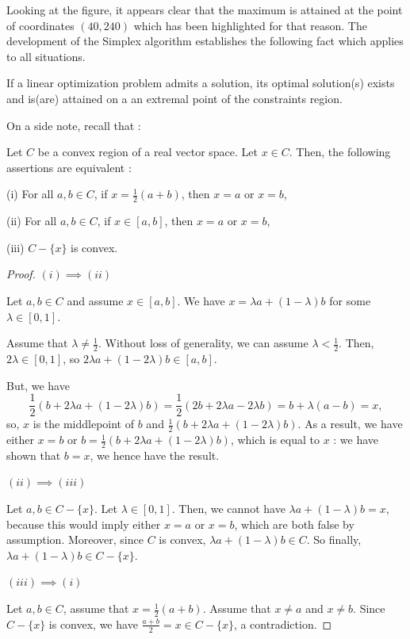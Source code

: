 Looking at the figure, it appears clear that the maximum is attained at the point of coordinates $ (40,240) $ which has been highlighted for that reason. The development of the Simplex algorithm establishes the following fact which applies to all situations.

\begin{theorem}
    If a linear optimization problem admits a solution, its optimal solution(s) exists and is(are) attained on a an extremal point of the constraints region.
\end{theorem}

On a side note, recall that :

\begin{proposition}\label{prop:extremal-points}
    Let $ C $ be a convex region of a real vector space. Let $ x \in C $. Then, the following assertions are equivalent :

    (i) For all $ a,b \in C $, if $ x = \frac 1 2 (a+b) $, then $ x = a $ or $ x = b $,

    (ii) For all $ a,b \in C $, if $ x \in [a,b] $, then $ x = a $ or $ x = b $,

    (iii) $ C - \{ x \} $ is convex.
\end{proposition}

\begin{proof}
    $ (i) \implies (ii) $
    
    Let $ a,b \in C $ and assume $ x \in [a,b] $. We have $ x = \lambda a + (1-\lambda) b $ for some $ \lambda \in [0,1] $.

    Assume that $ \lambda \neq \frac 1 2 $. Without loss of generality, we can assume $ \lambda < \frac 1 2 $. Then, $ 2\lambda \in [0,1] $, so $ 2\lambda a + (1-2\lambda) b \in [a,b] $.

    But, we have
    \[
        \frac 1 2 (b + 2\lambda a + (1-2\lambda)b) = \frac 1 2 (2b + 2\lambda a - 2\lambda b) = b + \lambda (a - b) = x,
    \]
    so, $ x $ is the middlepoint of $ b $ and $ \frac 1 2 (b + 2\lambda a + (1-2\lambda)b) $. As a result, we have either $ x = b $ or $ b = \frac 1 2 (b + 2\lambda a + (1-2\lambda)b )$, which is equal to $ x $ : we have shown that $ b = x $, we hence have the result.

    $ (ii) \implies (iii) $
    
    Let $ a,b \in C - \{ x \} $. Let $ \lambda \in [0,1] $. Then, we cannot have $ \lambda a + (1-\lambda) b = x $, because this would imply either $ x = a $ or $ x = b $, which are both false by assumption. Moreover, since $ C $ is convex, $ \lambda a + (1-\lambda) b \in C $. So finally, $ \lambda a + (1-\lambda) b \in C - \{ x \}$. 
    
    $ (iii) \implies (i) $

    Let $ a,b \in C $, assume that $ x = \frac 1 2 (a+b) $. Assume that $ x \neq a $ and $ x \neq b $. Since $ C - \{ x \} $ is convex, we have $ \frac{a+b}{2} = x \in C - \{ x \}$, a contradiction.
\end{proof}

